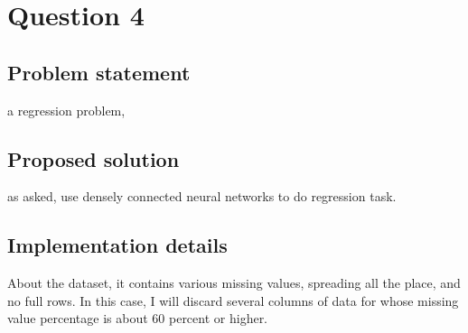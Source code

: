 \documentclass{article}
\begin{document}
\section*{Question 4}

\subsection*{Problem statement}

a regression problem,

\subsection*{Proposed solution}

as asked, use densely connected neural networks to do regression task.

\subsection*{Implementation details}

About the dataset, it contains various missing values, spreading all the place, and no full rows. In this case, I will discard several columns of data for whose missing value percentage is about 60 percent or higher.
\end{document}
